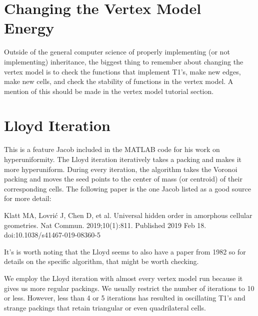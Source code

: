 \documentclass[12pt,a4paper]{article}
\begin{document}
\section{Changing the Vertex Model Energy}
Outside of the general computer science of properly implementing (or not implementing) inheritance, the biggest thing to remember about changing the vertex model is to check the functions that implement T1's, make new edges, make new cells, and check the stability of functions in the vertex model. A mention of this should be made in the vertex model tutorial section.

\section{Lloyd Iteration}
This is a feature Jacob included in the MATLAB code for his work on hyperuniformity. The Lloyd iteration iteratively takes a packing and makes it more hyperuniform. During every iteration, the algorithm takes the Voronoi packing and moves the seed points to the center of mass (or centroid) of their corresponding cells. The following paper is the one Jacob listed as a good source for more detail:

Klatt MA, Lovrić J, Chen D, et al. Universal hidden order in amorphous cellular geometries. Nat Commun. 2019;10(1):811. Published 2019 Feb 18. doi:10.1038/s41467-019-08360-5

It's is worth noting that the Lloyd seems to also have a paper from 1982 so for details on the specific algorithm, that might be worth checking. 

We employ the Lloyd iteration with almost every vertex model run because it gives us more regular packings. We usually restrict the number of iterations to 10 or less. However, less than 4 or 5 iterations has resulted in oscillating T1's and strange packings that retain triangular or even quadrilateral cells. 
\end{document}

